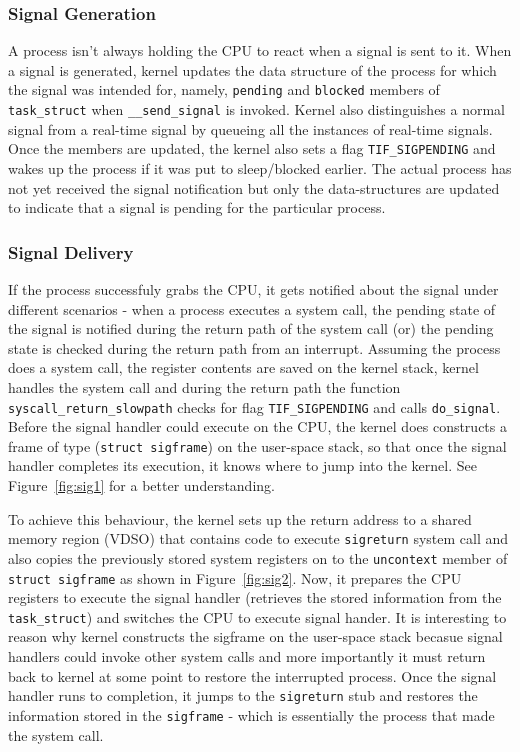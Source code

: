 \documentclass{sig-alternate-05-2015}
\begin{document}
\subsubsection{Signal Generation}
A process isn't always holding the CPU to react when a signal is sent to it. When a signal is generated, kernel updates the data structure of the process for which the signal was intended for, namely, \texttt{pending} and \texttt{blocked} members of \texttt{task\_struct} when \texttt{\_\_send\_signal} is invoked. Kernel also distinguishes a normal signal from a real-time signal by queueing all the instances of real-time signals. Once the members are updated, the kernel also sets a flag \texttt{TIF\_SIGPENDING} and wakes up the process
if it was put to sleep/blocked earlier. The actual process has not yet received the signal notification but only the data-structures are updated to indicate that a signal is pending for the particular process.

\subsubsection{Signal Delivery}
If the process successfuly grabs the CPU, it gets notified about the signal under different scenarios - when a process executes a system call, the pending state of the signal is notified during the return path of the system call (or) the pending state is checked during the return path from an interrupt. Assuming the process does a system call, the register contents are saved on the kernel stack, kernel handles the system call and during the return path the function \texttt{syscall\_return\_slowpath} checks for flag \texttt{TIF\_SIGPENDING} and calls \texttt{do\_signal}. Before the signal handler could execute on the CPU, the kernel does constructs a frame of type (\texttt{struct sigframe}) on the user-space stack, so that once the signal handler completes its execution, it knows where to jump into the kernel. See Figure~\ref{fig:sig1} for a better understanding. 
\par To achieve this behaviour, the kernel sets up the return address to a shared memory region (VDSO) that contains code to execute \texttt{sigreturn} system call and also copies the previously stored system registers on to the \texttt{uncontext} member of \texttt{struct sigframe} as shown in Figure~\ref{fig:sig2}. Now, it prepares the CPU registers to execute the signal handler (retrieves the stored information from the \texttt{task\_struct}) and switches the CPU to execute signal hander. It is interesting to reason why kernel constructs the sigframe on the user-space stack becasue signal handlers could invoke other system calls and more importantly it must return back to kernel at some point to restore the interrupted process. Once the signal handler runs to completion, it jumps to the \texttt{sigreturn} stub and restores the information stored in the \texttt{sigframe} - which is essentially the process that made the system call.
\end{document}
